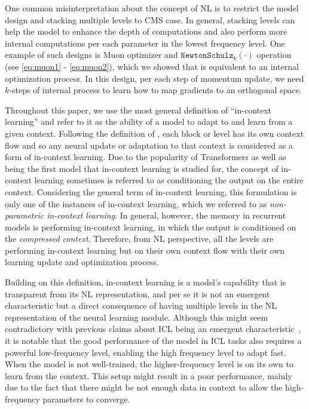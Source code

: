 { One common misinterpretation about the concept of NL is to restrict the model design and stacking multiple levels to CMS case. In general, stacking levels can help the model to enhance the depth of computations and also perform more internal computations per each parameter in the lowest frequency level. One example of such designs is Muon optimizer and $\texttt{NewtonSchulz}_k(\cdot)$ operation (see \autoref{eq:muon1} - \ref{eq:muon2}), which we showed that is equivalent to an internal optimization process. In this design, per each step of momentum update, we need $k$-steps of internal process to learn how to map gradients to an orthogonal space. 





Throughout this paper, we use the most general definition of ``in-context learning'' and refer to it as the ability of a model to adapt to and learn from a given context. Following the definition of \nsam, each block or level has its own context flow and so any neural update or adaptation to that context is considered as a form of in-context learning. Due to the popularity of Transformers as well as being the first model that in-context learning is studied for, the concept of in-context learning sometimes is referred to as conditioning the output on the entire context. Considering the general term of in-context learning, this formulation is only one of the instances of in-context learning, which we referred to as \emph{non-parametric in-context learning}. In general, however, the memory in recurrent models is performing in-context learning, in which the output is conditioned on the \emph{compressed context}. Therefore, from NL perspective, all the levels are performing in-context learning but on their own context flow with their own learning update and optimization process. 

Building on this definition, in-context learning is a model's capability  that is transparent from its NL representation, and per se it is not an emergent characteristic but a direct consequence of having multiple levels in the NL representation of the neural learning module. Although this might seem contradictory with previous claims about ICL being an emergent characteristic~\citep{brown2020language, singh2023transient}, it is notable that the good performance of the model in ICL tasks also requires a powerful low-frequency level, enabling the high frequency level to adapt fast. When the model is not well-trained, the higher-frequency level is on its own to learn from the context. This setup might result in a poor performance, mainly due to the fact that there might be not enough data in context to allow the high-frequency parameters to converge.  


}
